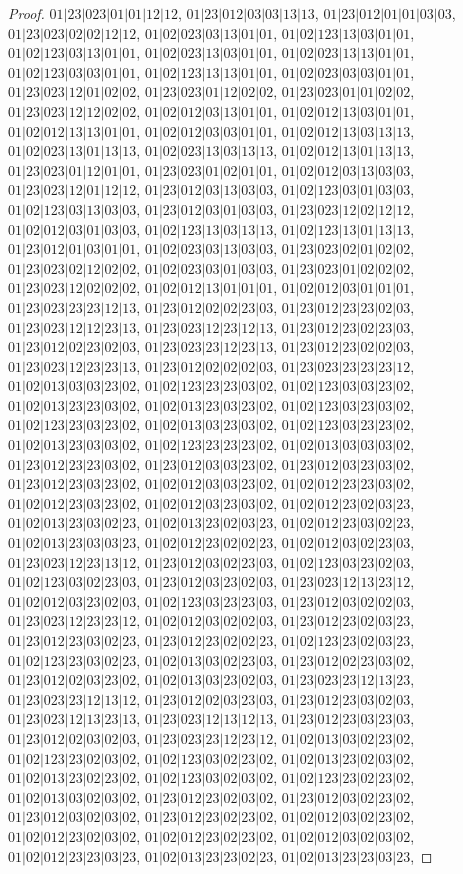 \documentclass[12pt]{article}
\theoremstyle{plain}
\theoremstyle{definition}
\theoremstyle{remark}
\begin{document}
\begin{proof}
$01|23|023|01|01|12|12$, $01|23|012|03|03|13|13$, $01|23|012|01|01|03|03$, $01|23|023|02|02|12|12$, $01|02|023|03|13|01|01$, $01|02|123|13|03|01|01$, $01|02|123|03|13|01|01$, $01|02|023|13|03|01|01$, $01|02|023|13|13|01|01$, $01|02|123|03|03|01|01$, $01|02|123|13|13|01|01$, $01|02|023|03|03|01|01$, $01|23|023|12|01|02|02$, $01|23|023|01|12|02|02$, $01|23|023|01|01|02|02$, $01|23|023|12|12|02|02$, $01|02|012|03|13|01|01$, $01|02|012|13|03|01|01$, $01|02|012|13|13|01|01$, $01|02|012|03|03|01|01$, $01|02|012|13|03|13|13$, $01|02|023|13|01|13|13$, $01|02|023|13|03|13|13$, $01|02|012|13|01|13|13$, $01|23|023|01|12|01|01$, $01|23|023|01|02|01|01$, $01|02|012|03|13|03|03$, $01|23|023|12|01|12|12$, $01|23|012|03|13|03|03$, $01|02|123|03|01|03|03$, $01|02|123|03|13|03|03$, $01|23|012|03|01|03|03$, $01|23|023|12|02|12|12$, $01|02|012|03|01|03|03$, $01|02|123|13|03|13|13$, $01|02|123|13|01|13|13$, $01|23|012|01|03|01|01$, $01|02|023|03|13|03|03$, $01|23|023|02|01|02|02$, $01|23|023|02|12|02|02$, $01|02|023|03|01|03|03$, $01|23|023|01|02|02|02$, $01|23|023|12|02|02|02$, $01|02|012|13|01|01|01$, $01|02|012|03|01|01|01$, $01|23|023|23|23|12|13$, $01|23|012|02|02|23|03$, $01|23|012|23|23|02|03$, $01|23|023|12|12|23|13$, $01|23|023|12|23|12|13$, $01|23|012|23|02|23|03$, $01|23|012|02|23|02|03$, $01|23|023|23|12|23|13$, $01|23|012|23|02|02|03$, $01|23|023|12|23|23|13$, $01|23|012|02|02|02|03$, $01|23|023|23|23|23|12$, $01|02|013|03|03|23|02$, $01|02|123|23|23|03|02$, $01|02|123|03|03|23|02$, $01|02|013|23|23|03|02$, $01|02|013|23|03|23|02$, $01|02|123|03|23|03|02$, $01|02|123|23|03|23|02$, $01|02|013|03|23|03|02$, $01|02|123|03|23|23|02$, $01|02|013|23|03|03|02$, $01|02|123|23|23|23|02$, $01|02|013|03|03|03|02$, $01|23|012|23|23|03|02$, $01|23|012|03|03|23|02$, $01|23|012|03|23|03|02$, $01|23|012|23|03|23|02$, $01|02|012|03|03|23|02$, $01|02|012|23|23|03|02$, $01|02|012|23|03|23|02$, $01|02|012|03|23|03|02$, $01|02|012|23|02|03|23$, $01|02|013|23|03|02|23$, $01|02|013|23|02|03|23$, $01|02|012|23|03|02|23$, $01|02|013|23|03|03|23$, $01|02|012|23|02|02|23$, $01|02|012|03|02|23|03$, $01|23|023|12|23|13|12$, $01|23|012|03|02|23|03$, $01|02|123|03|23|02|03$, $01|02|123|03|02|23|03$, $01|23|012|03|23|02|03$, $01|23|023|12|13|23|12$, $01|02|012|03|23|02|03$, $01|02|123|03|23|23|03$, $01|23|012|03|02|02|03$, $01|23|023|12|23|23|12$, $01|02|012|03|02|02|03$, $01|23|012|23|02|03|23$, $01|23|012|23|03|02|23$, $01|23|012|23|02|02|23$, $01|02|123|23|02|03|23$, $01|02|123|23|03|02|23$, $01|02|013|03|02|23|03$, $01|23|012|02|23|03|02$, $01|23|012|02|03|23|02$, $01|02|013|03|23|02|03$, $01|23|023|23|12|13|23$, $01|23|023|23|12|13|12$, $01|23|012|02|03|23|03$, $01|23|012|23|03|02|03$, $01|23|023|12|13|23|13$, $01|23|023|12|13|12|13$, $01|23|012|23|03|23|03$, $01|23|012|02|03|02|03$, $01|23|023|23|12|23|12$, $01|02|013|03|02|23|02$, $01|02|123|23|02|03|02$, $01|02|123|03|02|23|02$, $01|02|013|23|02|03|02$, $01|02|013|23|02|23|02$, $01|02|123|03|02|03|02$, $01|02|123|23|02|23|02$, $01|02|013|03|02|03|02$, $01|23|012|23|02|03|02$, $01|23|012|03|02|23|02$, $01|23|012|03|02|03|02$, $01|23|012|23|02|23|02$, $01|02|012|03|02|23|02$, $01|02|012|23|02|03|02$, $01|02|012|23|02|23|02$, $01|02|012|03|02|03|02$, $01|02|012|23|23|03|23$, $01|02|013|23|23|02|23$, $01|02|013|23|23|03|23$, 
\end{proof}
\end{document}

